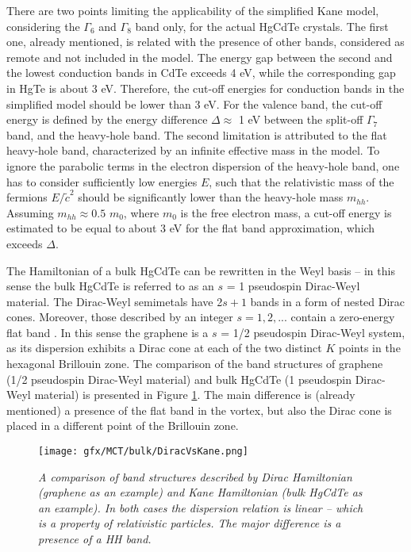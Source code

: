 \documentclass[titlepage,a4paper]{book}
\begin{document}
There are two points limiting the applicability of the simplified Kane model, considering the $\Gamma_6$ and $\Gamma_8$ band only, for the actual HgCdTe crystals. The first one, already mentioned, is related with the presence of other bands, considered as remote and not included in the model. The energy gap between the second and the lowest conduction bands in CdTe exceeds 4 eV, while the corresponding gap in HgTe is about 3 eV. Therefore, the cut-off energies for conduction bands in the simplified model should be lower than 3 eV. For the valence band, the cut-off energy is defined by the energy difference $\Delta \approx$ 1 eV between the split-off $\Gamma_7$ band, and the heavy-hole band. The second limitation is attributed to the flat heavy-hole band, characterized by an infinite effective mass in the model. To ignore the parabolic terms in the electron dispersion of the heavy-hole band, one has to consider sufficiently low energies $E$, such that the relativistic mass of the fermions $E/\tilde{c}^2$ should be significantly lower than the heavy-hole mass $m_{hh}$. Assuming $m_{hh} \approx 0.5$ $m_0$, where $m_0$ is the free electron mass, a cut-off energy is estimated to be equal to about 3 eV for the flat band approximation, which exceeds $\Delta$.

The Hamiltonian of a bulk HgCdTe can be rewritten in the Weyl basis -- in this sense the bulk HgCdTe is referred to as an $s$ = 1 pseudospin Dirac-Weyl material. The Dirac-Weyl semimetals have 2$s+1$ bands in a form of nested Dirac cones. Moreover, those described by an integer $s = 1, 2,...$ contain a zero-energy flat band \cite{Malcolm_MCT2}. In this sense the graphene is a $s$ = 1/2 pseudospin Dirac-Weyl system, as its dispersion exhibits a Dirac cone at each of the two distinct $K$ points in the hexagonal Brillouin zone. The comparison of the band structures of graphene (1/2 pseudospin Dirac-Weyl material) and bulk HgCdTe (1 pseudospin Dirac-Weyl material) is presented in Figure \ref{fig:DiracVsKane}. The main difference is (already mentioned) a presence of the flat band in the vortex, but also the Dirac cone is placed in a different point of the Brillouin zone.
\begin{figure}[ht]
	\centering
	\texttt{[image: gfx/MCT/bulk/DiracVsKane.png]}
	\vspace{-10pt}
	\caption{\textit{A comparison of band structures described by Dirac Hamiltonian (graphene as an example) and Kane Hamiltonian (bulk HgCdTe as an example). In both cases the dispersion relation is linear -- which is a property of relativistic particles. The major difference is a presence of a HH band.}}
	\label{fig:DiracVsKane}
\end{figure}
\end{document}
